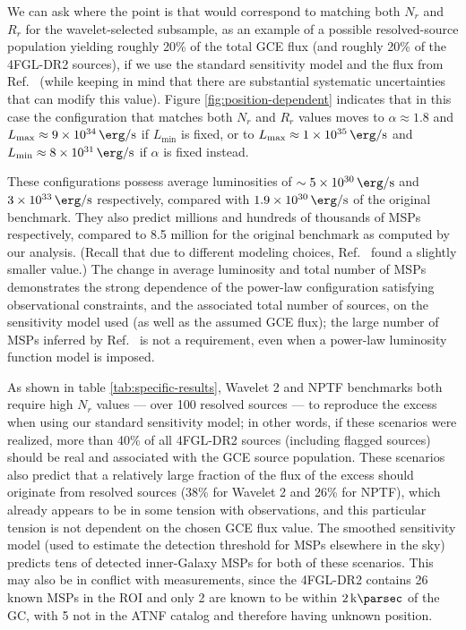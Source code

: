 \documentclass[letter,11pt]{article}
\begin{document}
We can ask where the point is that would correspond to matching both $N_r$ and $R_r$ for the wavelet-selected subsample, as an example of a possible resolved-source population yielding roughly 20\% of the total GCE flux (and roughly 20\% of the 4FGL-DR2 sources), if we use the standard sensitivity model and the flux from Ref.~\cite{DiMauro:2021raz} (while keeping in mind that there are substantial systematic uncertainties that can modify this value). Figure \ref{fig:position-dependent} indicates that in this case the configuration that matches both $N_r$ and $R_r$ values moves to $\alpha \approx 1.8$ and $L_\text{max} \approx  \SI{9e34}{\erg\per\second}$ if $L_\text{min}$ is fixed, or to $L_\text{max} \approx \SI{1e35}{\erg\per\second}$ and $L_\text{min} \approx \SI{8e31}{\erg\per\second}$ if $\alpha$ is fixed instead. 

These configurations possess average luminosities of $\sim\SI{5e30}{\erg\per\second}$ and $\SI{3e33}{\erg\per\second}$ respectively, compared with $\SI{1.9e30}{\erg\per\second}$ of the original benchmark. They also predict millions and hundreds of thousands of MSPs respectively, compared to 8.5 million for the original benchmark as computed by our analysis. (Recall that due to different modeling choices, Ref.~\cite{Zhong:2019ycb} found a slightly smaller value.) The change in average luminosity and total number of MSPs demonstrates the strong dependence of the power-law configuration satisfying observational constraints, and the associated total number of sources, on the sensitivity model used (as well as the assumed GCE flux); the large number of MSPs inferred by Ref.~\cite{Zhong:2019ycb} is not a requirement, even when a power-law luminosity function model is imposed.

As shown in table \ref{tab:specific-results}, Wavelet 2 and NPTF benchmarks both require high $N_r$ values --- over 100 resolved sources --- to reproduce the excess when using our standard sensitivity model; in other words, if these scenarios were realized, more than 40\% of all 4FGL-DR2 sources (including flagged sources) should be real and associated with the GCE source population. These scenarios also predict that a relatively large fraction of the flux of the excess should originate from resolved sources (38\% for Wavelet 2 and 26\% for NPTF), which already appears to be in some tension with observations, and this particular tension is not dependent on the chosen GCE flux value. The smoothed sensitivity model (used to estimate the detection threshold for MSPs elsewhere in the sky) predicts tens of detected inner-Galaxy MSPs for both of these scenarios. This may also be in conflict with measurements, since the 4FGL-DR2  contains 26 known MSPs in the ROI and only 2 are known to be within $\SI{2}{\kilo\parsec}$ of the GC, with 5 not in the ATNF catalog and therefore having unknown position.
\end{document}
